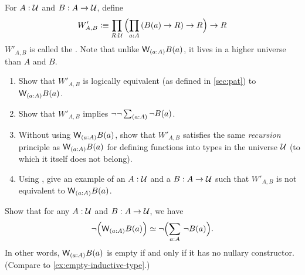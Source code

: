 \documentclass[hott-all.tex]{subfiles}
\begin{document}
% 
\begin{ex}
  For $A:\mathcal{U}$ and $B:A\to \mathcal{U}$, define
  \[ W'_{A,B} \defeq \prd{R:\UU} \Parens{\prd{a:A} (B(a) \to R) \to R} \to R \]
  $W'_{A,B}$ is called the .
  Note that unlike $\wtype{a:A} B(a)$, it lives in a higher universe than $A$ and $B$.
  \begin{enumerate}
  \item Show that $W'_{A,B}$ is logically equivalent (as defined in \cref{sec:pat}) to $\wtype{a:A} B(a)$.
  \item Show that $W'_{A,B}$ implies $\neg\neg \sm{a:A} \neg B(a)$.
  \item Without using $\wtype{a:A} B(a)$, show that $W'_{A,B}$ satisfies the same \emph{recursion} principle as $\wtype{a:A} B(a)$ for defining functions into types in the universe $\mathcal{U}$ (to which it itself does not belong).
  \item Using \LEM, give an example of an $A:\mathcal{U}$ and a $B:A\to \mathcal{U}$ such that $W'_{A,B}$ is not equivalent to $\wtype{a:A} B(a)$.
  \end{enumerate}
\end{ex}
% 
\begin{ex}
  Show that for any $A:\mathcal{U}$ and $B:A\to\mathcal{U}$, we have
  \[ \eqv{\neg\Parens{\wtype{a:A} B(a)}}{\neg\Parens{\sm{a:A} \neg B(a)}}. \]
  In other words, $\wtype{a:A} B(a)$ is empty if and only if it has no nullary constructor.
  (Compare to \cref{ex:empty-inductive-type}.)
\end{ex}
% 
% 
% 
% 
\end{document}

